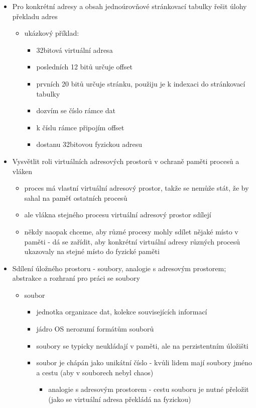 \begin{itemize}
\begin{itemize}
\end{itemize}
\item Pro konkrétní adresy a obsah jednoúrovňové stránkovací tabulky řešit úlohy překladu adres
\begin{itemize}
\item ukázkový příklad:
\begin{itemize}
\item 32bitová virtuální adresa
\item posledních 12 bitů určuje offset
\item prvních 20 bitů určuje stránku, použiju je k indexaci do stránkovací tabulky
\item dozvím se číslo rámce dat
\item k číslu rámce připojím offset
\item dostanu 32bitovou fyzickou adresu
\end{itemize}
\end{itemize}
\item Vysvětlit roli virtuálních adresových prostorů v ochraně paměti procesů a vláken
\begin{itemize}
\item proces má vlastní virtuální adresový prostor, takže se nemůže stát, že by sahal na paměť ostatních procesů
\item ale vlákna stejného procesu virtuální adresový prostor sdílejí
\item někdy naopak chceme, aby různé procesy mohly sdílet nějaké místo v paměti - dá se zařídit, aby konkrétní virtuální adresy různých procesů ukazovaly na stejné místo do fyzické paměti
\end{itemize}
\item Sdílení úložného prostoru - soubory, analogie s adresovým prostorem; abstrakce a rozhraní pro práci se soubory
\begin{itemize}
\item soubor
\begin{itemize}
\item jednotka organizace dat, kolekce souvisejících informací
\item jádro OS nerozumí formátům souborů
\item soubory se typicky neukládají v paměti, ale na perzistentním úložišti
\item soubor je chápán jako unikátní číslo - kvůli lidem mají soubory jméno a cestu (aby v souborech nebyl chaos)
\begin{itemize}
\item analogie s adresovým prostorem - cestu souboru je nutné přeložit (jako se virtuální adresa překládá na fyzickou)

\end{itemize}
\end{itemize}
\end{itemize}
\end{itemize}
